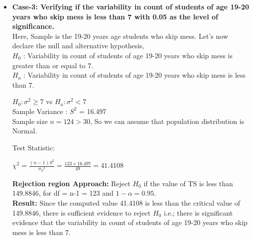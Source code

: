 \documentclass{article}
\begin{document}
\begin{itemize}
\item{\textbf{Case-3: Verifying if the variability in count of students of age 19-20 years who skip mess is less than 7 with 0.05 as the level of significance.}}\\
Here, Sample is the 19-20 years age students who skip mess.
Let's now declare the null and alternative hypothesis,\\
$H_0$ : Variability in count of students of age 19-20 years who skip mess is greater than or equal to 7.\\
$H_a$ : Variability in count of students of age 19-20 years who skip mess is less than 7.
\begin{center}
$H_0 : \sigma^2 \geq 7$ vs $H_a : \sigma^2 < 7$\\
Sample Variance : $S^2$ = 16.497\\
Sample size $n = 124 > 30$, So we can assume that population distribution is Normal.
\end{center}
Test Statistic:
\begin{center}
$\chi^2 = \frac{(n-1){S^2}}{{\sigma_0}^2} = \frac{123\times16.497}{49} = 41.4108$
\end{center}
\textbf{Rejection region Approach:} 
Reject $H_0$ if the value of TS is less than 149.8846, for df = n-1 = 123 and $1 - \alpha = 0.95$.\\
\textbf{Result:}
Since the computed value 41.4108 is less than the critical value of 149.8846, there is sufficient evidence to reject $H_0$ i.e.; there is significant evidence that the variability in count of students of age 19-20 years who skip mess is less than 7.\\


\end{itemize}
\end{document}
